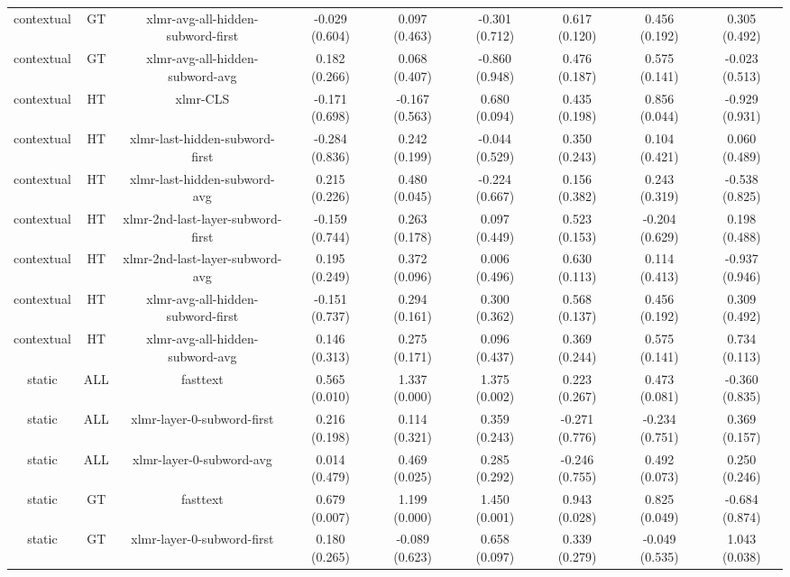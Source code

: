 \begin{sidewaystable}[htb]
\begin{tabular}{@{}ccccccccc@{}}
        contextual & GT & xlmr-avg-all-hidden-subword-first & -0.029 (0.604) & 0.097 (0.463) & -0.301 (0.712) & 0.617 (0.120) & 0.456 (0.192) & 0.305 (0.492) \\
        contextual & GT & xlmr-avg-all-hidden-subword-avg & 0.182 (0.266) & 0.068 (0.407) & -0.860 (0.948) & 0.476 (0.187) & 0.575 (0.141) & -0.023 (0.513) \\
        contextual & HT & xlmr-CLS & -0.171 (0.698) & -0.167 (0.563) & 0.680 (0.094) & 0.435 (0.198) & 0.856 (0.044) & -0.929 (0.931) \\
        contextual & HT & xlmr-last-hidden-subword-first & -0.284 (0.836) & 0.242 (0.199) & -0.044 (0.529) & 0.350 (0.243) & 0.104 (0.421) & 0.060 (0.489) \\
        contextual & HT & xlmr-last-hidden-subword-avg & 0.215 (0.226) & 0.480 (0.045) & -0.224 (0.667) & 0.156 (0.382) & 0.243 (0.319) & -0.538 (0.825) \\
        contextual & HT & xlmr-2nd-last-layer-subword-first & -0.159 (0.744) & 0.263 (0.178) & 0.097 (0.449) & 0.523 (0.153) & -0.204 (0.629) & 0.198 (0.488) \\
        contextual & HT & xlmr-2nd-last-layer-subword-avg & 0.195 (0.249) & 0.372 (0.096) & 0.006 (0.496) & 0.630 (0.113) & 0.114 (0.413) & -0.937 (0.946) \\
        contextual & HT & xlmr-avg-all-hidden-subword-first & -0.151 (0.737) & 0.294 (0.161) & 0.300 (0.362) & 0.568 (0.137) & 0.456 (0.192) & 0.309 (0.492) \\
        contextual & HT & xlmr-avg-all-hidden-subword-avg & 0.146 (0.313) & 0.275 (0.171) & 0.096 (0.437) & 0.369 (0.244) & 0.575 (0.141) & 0.734 (0.113) \\
        static & ALL & fasttext & 0.565 (0.010) & 1.337 (0.000) & 1.375 (0.002) & 0.223 (0.267) & 0.473 (0.081) & -0.360 (0.835) \\
        static & ALL & xlmr-layer-0-subword-first & 0.216 (0.198) & 0.114 (0.321) & 0.359 (0.243) & -0.271 (0.776) & -0.234 (0.751) & 0.369 (0.157) \\
        static & ALL & xlmr-layer-0-subword-avg & 0.014 (0.479) & 0.469 (0.025) & 0.285 (0.292) & -0.246 (0.755) & 0.492 (0.073) & 0.250 (0.246) \\
        static & GT & fasttext & 0.679 (0.007) & 1.199 (0.000) & 1.450 (0.001) & 0.943 (0.028) & 0.825 (0.049) & -0.684 (0.874) \\
        static & GT & xlmr-layer-0-subword-first & 0.180 (0.265) & -0.089 (0.623) & 0.658 (0.097) & 0.339 (0.279) & -0.049 (0.535) & 1.043 (0.038) \\

\end{tabular}
\end{sidewaystable}
